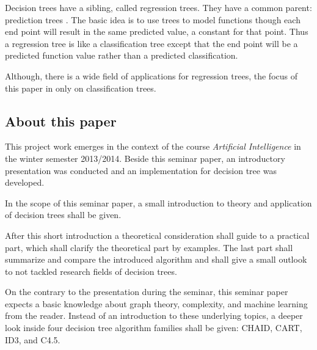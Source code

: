 Decision trees have a sibling, called regression trees. They have a common parent: prediction trees \cite{goldman2010self}. The basic idea is to use trees to model functions though each end point will result in the same predicted value, a constant for that point. Thus a regression tree is like a classification tree except that the end point will be a predicted function value rather than a predicted classification. 


   
Although, there is a wide field of applications for regression trees, the focus of this paper in only on classification trees.



\subsection{About this paper}

This project work emerges in the context of the course \textit{Artificial Intelligence} in the winter semester 2013/2014. Beside this seminar paper, an introductory presentation was conducted and an implementation for decision tree was developed. 

In the scope of this seminar paper, a small introduction to theory and application of decision trees shall be given. 

After this short introduction a theoretical consideration shall guide to a practical part, which shall clarify the theoretical part by examples. The last part shall summarize and compare the introduced algorithm and shall give a small outlook to not tackled research fields of decision trees.

On the contrary to the presentation during the seminar, this seminar paper expects a basic knowledge about graph theory, complexity, and machine learning from the reader. Instead of an introduction to these underlying topics, a deeper look inside four decision tree algorithm families shall be given: \textsc{CHAID}, \textsc{CART}, \textsc{ID3}, and \textsc{C4.5}.  

